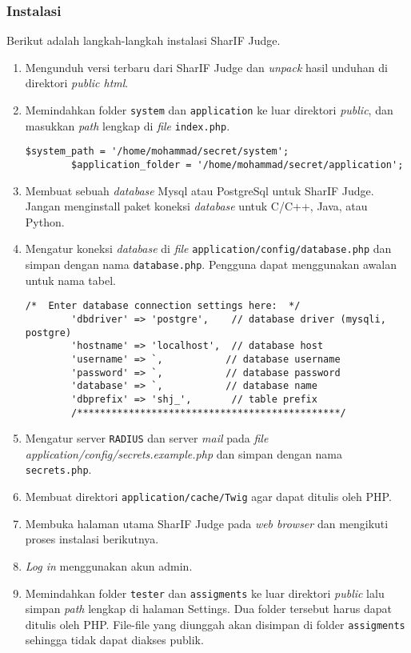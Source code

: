 \subsubsection{Instalasi}
\label{subsubsec:instalasi}
Berikut adalah langkah-langkah instalasi SharIF Judge.
\begin{enumerate}
	\item Mengunduh versi terbaru dari SharIF Judge dan \textit{unpack} hasil unduhan di direktori \textit{public html}.
	\item Memindahkan folder \verb|system| dan \verb|application| ke luar direktori \textit{public}, dan masukkan \textit{path} lengkap di \textit{file} \verb|index.php|.
	\begin{lstlisting}[basicstyle=\ttfamily, frame=single,
		columns=fullflexible, keepspaces=true, breaklines=true, label=ls:2]
		$system_path = '/home/mohammad/secret/system';
		$application_folder = '/home/mohammad/secret/application';
	\end{lstlisting}
	\item Membuat sebuah \textit{database} Mysql atau PostgreSql untuk SharIF Judge. Jangan menginstall paket koneksi \textit{database} untuk C/C++, Java, atau Python.
	\item Mengatur koneksi \textit{database} di \textit{file} \verb|application/config/database.php| dan simpan dengan nama \verb|database.php|. Pengguna dapat
	menggunakan awalan untuk nama tabel.
	\begin{lstlisting}[basicstyle=\ttfamily, frame=single,
		columns=fullflexible, keepspaces=true, breaklines=true, label=ls:3]
		/*  Enter database connection settings here:  */
		'dbdriver' => 'postgre',    // database driver (mysqli, postgre)
		'hostname' => 'localhost',  // database host
		'username' => `,           // database username
		'password' => `,           // database password
		'database' => `,           // database name
		'dbprefix' => 'shj_',       // table prefix
		/**********************************************/
	\end{lstlisting}
	\item Mengatur server \verb|RADIUS| dan server \textit{mail} pada \textit{file application/config/secrets.example.php} dan simpan dengan nama \verb|secrets.php|.
	\item Membuat direktori \verb|application/cache/Twig| agar dapat ditulis oleh PHP.
	\item Membuka halaman utama SharIF Judge pada \textit{web browser} dan mengikuti proses instalasi berikutnya.
	\item \textit{Log in} menggunakan akun admin.
	\item Memindahkan folder \verb|tester| dan \verb|assigments| ke luar direktori \textit{public} lalu simpan \textit{path} lengkap di halaman Settings. Dua folder tersebut harus dapat ditulis oleh PHP. File-file yang diunggah
	akan disimpan di folder \verb|assigments| sehingga tidak dapat diakses publik.
\end{enumerate}

